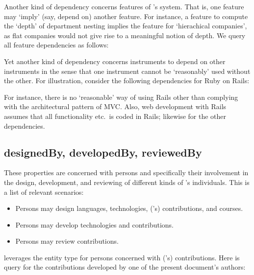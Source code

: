 

\noindent
Another kind of dependency concerns features of \ooo{}'s system. That
is, one feature may `imply' (say, depend on) another feature. For
instance, a feature to compute the `depth' of department nesting implies
the feature for `hierachical companies', as flat companies would not
give rise to a meaningful notion of depth. We query all feature
dependencies as follows:



\noindent
Yet another kind of dependency concerns instruments to depend on other
instruments in the sense that one instrument cannot be `reasonably'
used without the other. For illustration, consider the following
dependencies for Ruby on Rails:



\noindent
For instance, there is no `reasonable' way of using Rails other than
complying with the architectural pattern of MVC. Also, web development
with Rails assumes that all functionality etc.\ is coded in Rails;
likewise for the other dependencies.


\subsection{designedBy, developedBy, reviewedBy}
\label{S:designedBy}
\label{S:developedBy}
\label{S:reviewedBy}

These properties are concerned with persons and specifically
their involvement in the design, development, and reviewing of
different kinds of \solasote{}'s individuals. This is a list of
relevant scenarios:
%
\begin{itemize}
\item Persons may design languages, technologies, (\ooo{}'s) contributions, and
  courses.
\item Persons may develop technologies and contributions.
\item Persons may review contributions.
\end{itemize}
%
\solasote{} leverages the entity type  for
persons concerned with (\ooo{}'s) contributions. Here is query for the
contributions developed by one of the present document's authors:

